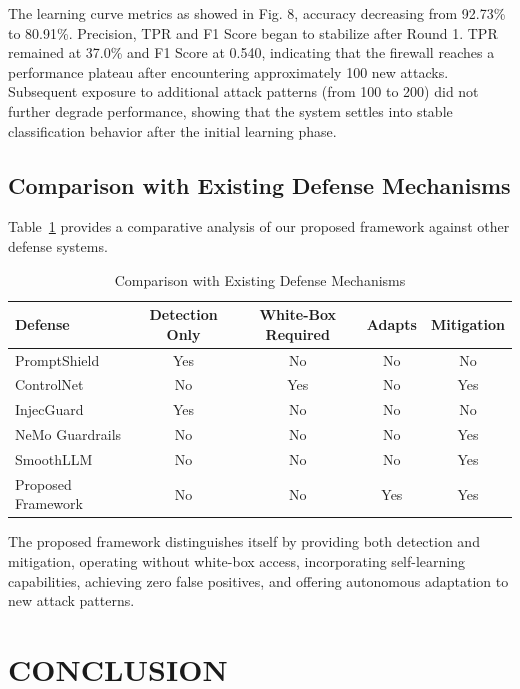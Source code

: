 \documentclass[10pt, conference, compsoc]{IEEEtran}
\begin{document}
The learning curve metrics as showed in Fig. 8, accuracy decreasing from 92.73\% to 80.91\%. Precision, TPR and F1 Score began to stabilize after Round 1. TPR remained at 37.0\% and F1 Score at 0.540, indicating that the firewall reaches a performance plateau after encountering approximately 100 new attacks. Subsequent exposure to additional attack patterns (from 100 to 200) did not further degrade performance, showing that the system settles into stable classification behavior after the initial learning phase.

\subsection{Comparison with Existing Defense Mechanisms}

Table~\ref{tab:comparison} provides a comparative analysis of our proposed framework against other defense systems.

\begin{table}[htbp]
\centering
\caption{Comparison with Existing Defense Mechanisms}
\label{tab:comparison}
\tiny
\begin{tabular}{|l|c|c|c|c|}
\hline
Defense & Detection Only & White-Box Required & Adapts & Mitigation \\
\hline
PromptShield \cite{jacob2024promptshield} & Yes & No & No & No \\
\hline
ControlNet \cite{yao2025controlnet} & No & Yes & No & Yes \\
\hline
InjecGuard \cite{li2024injecguard, li2025piguard} & Yes & No & No & No \\
\hline
NeMo Guardrails \cite{rebedea2023nemoguardrails} & No & No & No & Yes \\
\hline
SmoothLLM \cite{robey2023smoothllm} & No & No & No & Yes \\
\hline
Proposed Framework & No & No & Yes & Yes \\
\hline
\end{tabular}
\end{table}

The proposed framework distinguishes itself by providing both detection and mitigation, operating without white-box access, incorporating self-learning capabilities, achieving zero false positives, and offering autonomous adaptation to new attack patterns.

\section{CONCLUSION}
\end{document}
